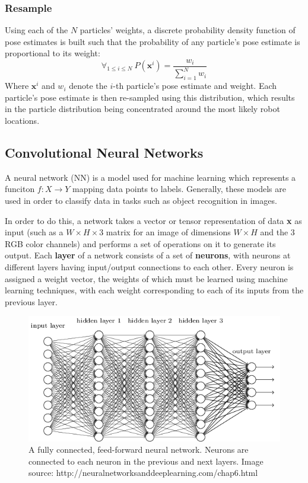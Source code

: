 \documentclass[letterpaper, 12 pt, conference]{ieeeconf}  %
\begin{document}
\subsubsection{Resample} 
Using each of the $N$ particles' weights, a discrete probability density function of pose estimates is built such that the probability of any particle's pose estimate is proportional to its weight: 
$$
\forall _{1\leq i \leq N}~P(\textbf{x}^i)=\frac{w_i}{\sum _{i=1} ^N w_i}
$$
Where $\textbf{x}^i$ and $w_i$ denote the $i$-th particle's pose estimate and weight. Each particle's pose estimate is then re-sampled using this distribution, which results in the particle distribution being concentrated around the most likely robot locations.  

\subsection{Convolutional Neural Networks}

A neural network (NN) is a model used for machine learning which represents a funciton $f:X\to Y$ mapping data points to labels. Generally, these models are used in order to classify data in tasks such as object recognition in images. 
\par
In order to do this, a network takes a vector or tensor representation of data \textbf{x} as input (such as a $W\times H \times 3$ matrix for an image of dimensions $W\times H$ and the 3 RGB color channels) and performs a set of operations on it to generate its output. Each \textbf{layer} of a network consists of a set of \textbf{neurons}, with neurons at different layers having input/output connections to each other. Every neuron is assigned a weight vector, the weights of which must be learned using machine learning techniques, with each weight corresponding to each of its inputs from the previous layer.  

\begin{figure}[h]
\centering
\includegraphics[scale=0.43]{neural_net}
\caption{A fully connected, feed-forward neural network. Neurons are connected to each neuron in the previous and next layers. Image source: http://neuralnetworksanddeeplearning.com/chap6.html}
\end{figure}
\end{document}
